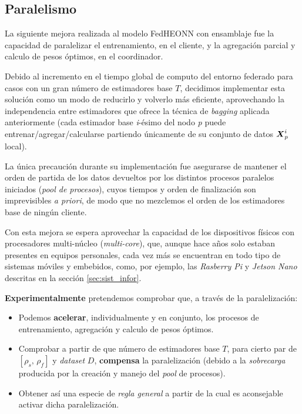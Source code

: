 \documentclass[00-Trabajo_Final.tex]{subfiles}
\begin{document}
\subsection{Paralelismo}
La siguiente mejora realizada al modelo FedHEONN con ensamblaje fue la capacidad de paralelizar el entrenamiento, en el cliente, y la agregación parcial y calculo de pesos óptimos, en el coordinador.

\vspace{0.5em}

Debido al incremento en el tiempo global de computo del entorno federado para casos con un gran número de estimadores base $T$, decidimos implementar esta solución como un modo de reducirlo y volverlo más eficiente, aprovechando la independencia entre estimadores que ofrece la técnica de \textit{bagging} aplicada anteriormente (cada estimador base \textit{i}-ésimo del nodo \textit{p} puede entrenar/agregar/calcularse partiendo únicamente de su conjunto de datos $\boldsymbol{X}_p^i$ local).

\vspace{0.5em}

La única precaución durante su implementación fue asegurarse de mantener el orden de partida de los datos devueltos por los distintos procesos paralelos iniciados (\textit{pool de procesos}), cuyos tiempos y orden de finalización son imprevisibles \textit{a priori}, de modo que no mezclemos el orden de los estimadores base de ningún cliente.

\vspace{0.5em}

Con esta mejora se espera aprovechar la capacidad de los dispositivos físicos con procesadores multi-núcleo (\textit{multi-core}), que, aunque hace años solo estaban presentes en equipos personales, cada vez más se encuentran en todo tipo de sistemas móviles y embebidos, como, por ejemplo, las \textit{Rasberry Pi} y \textit{Jetson Nano} descritas en la sección \ref{sec:sist_infor}.

\vspace{1em}

\noindent\textbf{Experimentalmente} pretendemos comprobar que, a través de la paralelización:
\begin{itemize}[noitemsep]
    \item Podemos \textbf{acelerar}, individualmente y en conjunto, los procesos de entrenamiento, agregación y calculo de pesos óptimos.
    \item Comprobar a partir de que número de estimadores base $T$, para cierto par de $[\rho_s,\, \rho_f]$ y \textit{dataset} $D$, \textbf{compensa} la paralelización (debido a la \textit{sobrecarga} producida por la creación y manejo del \textit{pool} de procesos).
    \item Obtener así una especie de \textit{regla general} a partir de la cual es aconsejable activar dicha paralelización.
\end{itemize}
\end{document}
